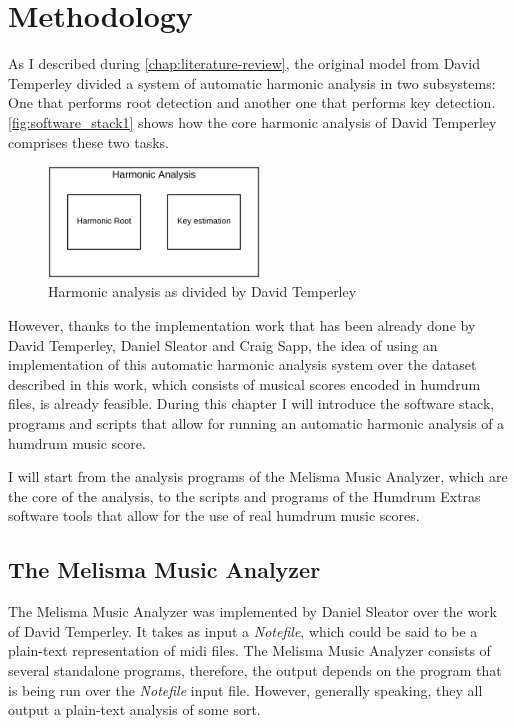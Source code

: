 \normallinespacing

\chapter{Methodology}
\label{chap:methodology}

As I described during \autoref{chap:literature-review}, the original model from David Temperley divided a system of automatic harmonic analysis in two subsystems: One that performs root detection and another one that performs key detection. \autoref{fig:software_stack1} shows how the core harmonic analysis of David Temperley comprises these two tasks.

\begin{figure}[ht]
  \centering
    \includegraphics[width=0.5\textwidth]{04-methodology/figures/1}
  \caption{Harmonic analysis as divided by David Temperley}
  \label{fig:software_stack1}
\end{figure}

However, thanks to the implementation work that has been already done by David Temperley, Daniel Sleator and Craig Sapp, the idea of using an implementation of this automatic harmonic analysis system over the dataset described in this work, which consists of musical scores encoded in humdrum files, is already feasible. During this chapter I will introduce the software stack, programs and scripts that allow for running an automatic harmonic analysis of a humdrum music score.

I will start from the analysis programs of the Melisma Music Analyzer, which are the core of the analysis, to the scripts and programs of the Humdrum Extras software tools that allow for the use of real humdrum music scores.

\section{The Melisma Music Analyzer}
  The Melisma Music Analyzer was implemented by Daniel Sleator over the work of David Temperley. It takes as input a \emph{Notefile}, which could be said to be a plain-text representation of midi files. The Melisma Music Analyzer consists of several standalone programs, therefore, the output depends on the program that is being run over the \emph{Notefile} input file. However, generally speaking, they all output a plain-text analysis of some sort.


